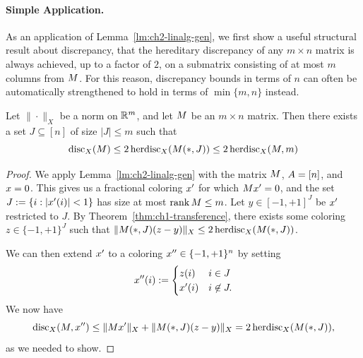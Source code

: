 \paragraph{Simple Application.} As an application of Lemma~\ref{lm:ch2-linalg-gen}, we first show
a useful structural result about discrepancy, that the
hereditary discrepancy of any \(m\times n\) matrix is always achieved, up to a
factor of \(2\), on a submatrix consisting of at most \(m\) columns
from \(M\). For this reason, discrepancy bounds in terms of \(n\)
can often be automatically strengthened to hold in terms of
\(\min\{m,n\}\) instead.

\begin{theorem}\label{thm:ch2-col-reduction}
  Let \(\|\cdot\|_X\) be a norm on \(\mathbb{R}^m\), and let \(M\) be an
  \(m\times n\) matrix. Then there exists a set \(J \subseteq [n]\) of
  size \(|J| \le m\) such that
  \[
    \disc_X(\mat) \le %
     2 \herdisc_X(\mat(*,J)) \le 2\herdisc_X(\mat,m)
  \]
\end{theorem}
\begin{proof}
  We apply Lemma~\ref{lm:ch2-linalg-gen} with the matrix \(M\),
  \(A = [n]\), and \(x = 0\). This gives us a fractional
  coloring \(x'\) for which \(M x' = 0\), and the set
  \(J := \{i: |x'(i)| < 1\}\) has size at most
  \(\operatorname{rank} M \le m\). 
  Let \(y\in [-1,+1]^J\) be \(x'\)
  restricted to \(J\). 
  By Theorem~\ref{thm:ch1-transference}, there
  exists some coloring \(z \in \{-1,+1\}^J\) such that
  \(\|M(*,J)(z-y)\|_X \le 2\operatorname{herdisc}_X(M(*,J))\). 
  
  We can then
  extend \(x'\) to a coloring \(x''\in \{-1,+1\}^n\) by setting
  \[
    \col''(i) \eqdef
    \begin{cases}
      z(i) & i \in J\\
      \col'(i) & i \not \in J. 
    \end{cases} %
  \]
  We now have
  \[
  \operatorname{disc}_X(M,x'') 
  \le
  \|M x'\|_X + \|M(*,J)(z-y)\|_X = 2\operatorname{herdisc}_X(M(*,J)),
  \]
  as we needed to show.
\end{proof}


